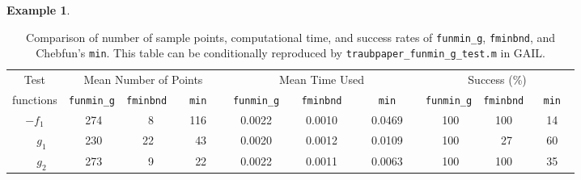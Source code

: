\documentclass[review]{elsarticle}
\theoremstyle{definition}
\newtheorem{exmp}{Example}
\newcommand{\funming}{\texttt{funmin\_g}\xspace}
\newcommand{\fminbnd}{\texttt{fminbnd}\xspace}
\begin{document}
\begin{exmp}
%
\begin{table}[tb]
	\centering
	\caption{Comparison of number of sample points, computational time,  and success
		rates of \funming, \fminbnd, and
		Chebfun's \texttt{min}.
		This table can be conditionally reproduced by
		\texttt{traubpaper\_funmin\_g\_test.m} in GAIL.}
	\label{tab:funmingVsfminbndVsChebfun}
	{\footnotesize

	\setlength{\tabcolsep}{.3em}
		\begin{tabular}{ccrccrccrccrccrccrccrccrccrc}		
			Test      &    \multicolumn{9}{c}{Mean Number of Points}   & \multicolumn{9}{c}{Mean Time Used}  & \multicolumn{9}{c}{Success (\%)}
			\\  functions &  \multicolumn{3}{c}{\funming} &  \multicolumn{3}{c}{\fminbnd}  &  \multicolumn{3}{c}{\texttt{min}}
		  &  \multicolumn{3}{c}{\funming}  &  \multicolumn{3}{c}{\fminbnd }  &  \multicolumn{3}{c}{\texttt{min} }  &  \multicolumn{3}{c}{\funming} & \multicolumn{3}{c}{\fminbnd} & \multicolumn{3}{c}{\texttt{min}}
			\\ \toprule
			$-f_1$   &&  274   &&&   8   &&&  116     &&&   0.0022   &&&   0.0010    &&& 0.0469  &&&   100   &&&  100   &&&  14
			\\ $\phantom{-}g_1$   && 230 &&&  22   &&&    43    &&& 0.0020  &&&    0.0012   &&&  0.0109 &&&    100   &&&   27   &&&  60
			\\ $\phantom{-}g_2$   &&  273 &&&   9   &&&   22    &&&  0.0022   &&&   0.0011    &&&  0.0063 &&&    100   &&& 100   &&&  35
		\end{tabular}
				
}
\end{table}
\end{exmp}
\end{document}
